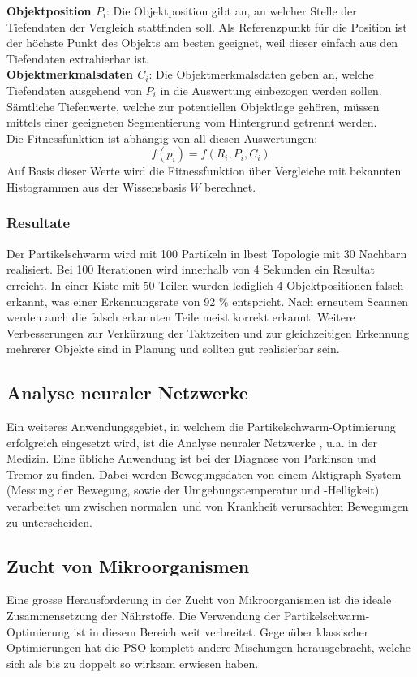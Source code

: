 \textbf{Objektposition $P_i$}: Die Objektposition gibt an, an welcher Stelle der Tiefendaten der Vergleich stattfinden soll. Als Referenzpunkt für die Position ist der höchste Punkt des Objekts am besten geeignet, weil dieser einfach aus den Tiefendaten extrahierbar ist. \\

\textbf{Objektmerkmalsdaten $C_i$}: Die Objektmerkmalsdaten geben an, welche Tiefendaten ausgehend von $P_i$ in die Auswertung einbezogen werden sollen. Sämtliche Tiefenwerte, welche zur potentiellen Objektlage gehören, müssen mittels einer geeigneten Segmentierung vom Hintergrund getrennt werden. \\


Die Fitnessfunktion ist abhängig von all diesen Auswertungen:
\begin{equation}
	f(p_i) = f(R_i,P_i,C_i)
\end{equation}
Auf Basis dieser Werte wird die Fitnessfunktion über Vergleiche mit bekannten Histogrammen aus der Wissensbasis $W$ berechnet.

\subsubsection{Resultate}
Der Partikelschwarm wird mit 100 Partikeln in lbest Topologie mit 30 Nachbarn realisiert. Bei 100 Iterationen wird innerhalb von 4 Sekunden ein Resultat erreicht. In einer Kiste mit 50 Teilen wurden lediglich 4 Objektpositionen falsch erkannt, was einer Erkennungsrate von 92 \% entspricht. Nach erneutem Scannen werden auch die falsch erkannten Teile meist korrekt erkannt. Weitere Verbesserungen zur Verkürzung der Taktzeiten und zur gleichzeitigen Erkennung  mehrerer Objekte sind in Planung und sollten gut realisierbar sein.

\subsection{Analyse neuraler Netzwerke}
Ein weiteres Anwendungsgebiet, in welchem die Partikelschwarm-Optimierung erfolgreich eingesetzt wird, ist die Analyse neuraler Netzwerke , u.a. in der Medizin. Eine übliche Anwendung ist bei der Diagnose von Parkinson und Tremor zu finden. Dabei werden Bewegungsdaten von einem Aktigraph-System (Messung der Bewegung, sowie der Umgebungstemperatur und -Helligkeit) verarbeitet um zwischen \textacutedbl normalen\textacutedbl \ und von Krankheit verursachten Bewegungen zu unterscheiden. \cite{Shi-Appl}

\subsection{Zucht von Mikroorganismen}
Eine grosse Herausforderung in der Zucht von Mikroorganismen ist die ideale Zusammensetzung der Nährstoffe. Die Verwendung der Partikelschwarm-Optimierung ist in diesem Bereich weit verbreitet. Gegenüber klassischer Optimierungen hat die PSO komplett andere Mischungen herausgebracht, welche sich als bis zu doppelt so wirksam erwiesen haben. \cite{Shi-Appl}
